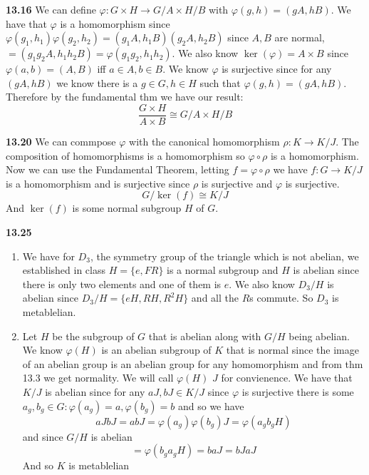 \documentclass[12pt]{article}
\newenvironment{ques}{\vspace{2 ex}}{\vspace{2 ex}}
\theoremstyle{definition}
\begin{document}
\begin{ques}
	\textbf{13.16} 
		We can define $\varphi: G \times H \to G/A \times H/B$ with
		$\varphi(g,h) = (gA, hB)$. We have that $\varphi$ is a
		homomorphism since $\varphi(g_1, h_1)\varphi(g_2, h_2) = (g_1A,
		h_1B)(g_2A, h_2B)$ since $A, B$ are normal, $= (g_1g_2A,
		h_1h_2B) = \varphi(g_1g_2, h_1h_2)$. We also know
		$\ker(\varphi) = A \times B$ since $\varphi(a, b) = (A, B)$ iff
		$a \in A, b \in B$. We know $\varphi$ is surjective since for
		any $(gA, hB)$ we know there is a $g \in G, h \in H$ such that
		$\varphi(g, h) = (gA, hB)$. Therefore by the fundamental thm we
		have our result:
		$$\frac{G \times H}{A \times B} \cong G/A \times H/B$$
\end{ques}

\begin{ques} 
	\textbf{13.20} 
		We can commpose $\varphi$ with the canonical homomorphism $\rho
		: K \to K/J$. The composition of homomorphisms is a
		homomorphism so $\varphi \circ \rho$ is a homomorphism.
		Now we can use the Fundamental Theorem, letting $f = \varphi
		\circ \rho$ we have $f: G \to K/J$ is a homomorphism and is
		surjective since $\rho$ is surjective and $\varphi$ is
		surjective.
		$$G/\ker(f) \cong K/J$$
		And $\ker(f)$ is some normal subgroup $H$ of $G$.
\end{ques}

\begin{ques} 
	\textbf{13.25} 
		\begin{enumerate}
			\item
				We have for $D_3$, the symmetry group of the
				triangle which is not abelian, we established
				in class $H = \{e, FR\}$ is a normal subgroup
				and $H$ is abelian since there is only two
				elements and one of them is $e$.  We also know
				$D_3/H$ is abelian since $D_3/H = \{eH, RH,
				R^2H\}$ and all the $R$s commute. So $D_3$ is
				metablelian. 
			\item
				Let $H$ be the subgroup of $G$ that is
				abelian along with $G/H$ being abelian. We know
				$\varphi(H)$ is an abelian subgroup of $K$ that
				is normal since the image of an abelian group
				is an abelian group for any homomorphism and
				from thm 13.3 we get normality. We will call
				$\varphi(H)$ $J$ for convienence. We have
				that $K/J$ is abelian since for any
				$aJ, bJ \in K/J$ since $\varphi$ is
				surjective there is some $a_g, b_g \in G:
				\varphi(a_g) = a, \varphi(b_g) = b$ and so we
				have 
				$$aJbJ = abJ = \varphi(a_g)\varphi(b_g)J =
				\varphi(a_gb_gH)$$
				and since $G/H$ is abelian
				$$= \varphi(b_ga_gH) = baJ = bJaJ$$
				And so $K$ is metablelian

		\end{enumerate}
\end{ques}
\end{document}
